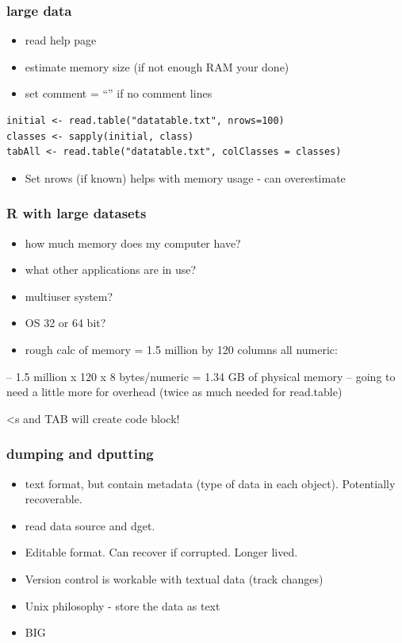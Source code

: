 \documentclass[11pt]{article}
\begin{document}
\subsubsection{large data}
\label{sec-1-7-3}

\begin{itemize}
\item read help page
\item estimate memory size (if not enough RAM your done)
\item set comment = ``'' if no comment lines
\end{itemize}


\begin{verbatim}
initial <- read.table("datatable.txt", nrows=100)
classes <- sapply(initial, class)
tabAll <- read.table("datatable.txt", colClasses = classes)
\end{verbatim}

\begin{itemize}
\item Set nrows (if known) helps with memory usage - can overestimate
\end{itemize}
\subsubsection{R with large datasets}
\label{sec-1-7-4}

\begin{itemize}
\item how much memory does my computer have?
\item what other applications are in use?
\item multiuser system?
\item OS 32 or 64 bit?
\item rough calc of memory = 1.5 million by 120 columns all numeric:
\end{itemize}
-- 1.5 million x 120 x 8 bytes/numeric = 1.34 GB of physical memory
-- going to need a little more for overhead (twice as much needed for
read.table)


<s and TAB will create code block!
\subsubsection{dumping and dputting}
\label{sec-1-7-5}

\begin{itemize}
\item text format, but contain metadata (type of data in each
  object). Potentially recoverable.
\item read data source and dget.
\item Editable format. Can recover if corrupted. Longer lived.
\item Version control is workable with textual data (track changes)
\item Unix philosophy - store the data as text
\item BIG
\end{itemize}
\end{document}
